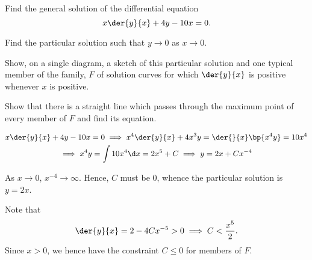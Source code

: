 \begin{problem}
    Find the general solution of the differential equation \[x\der{y}{x} + 4y - 10x = 0.\]

    Find the particular solution such that $y \to 0$ as $x \to 0$.

    Show, on a single diagram, a sketch of this particular solution and one typical member of the family, $F$ of solution curves for which $\der{y}{x}$ is positive whenever $x$ is positive.

    Show that there is a straight line which passes through the maximum point of every member of $F$ and find its equation.
\end{problem}
\begin{solution}
    \begin{gather*}
        x\der{y}{x} + 4y - 10x = 0 \implies x^4\der{y}{x} + 4x^3y = \der{}{x} \bp{x^4 y} = 10x^4\\
        \implies x^4 y = \int 10 x^4 \d x = 2x^5 + C \implies y = 2x + Cx^{-4}
    \end{gather*}

    As $x \to 0$, $x^{-4} \to \infty$. Hence, $C$ must be 0, whence the particular solution is $y = 2x$.

    Note that \[\der{y}{x} = 2 - 4Cx^{-5} > 0 \implies C < \frac{x^5}2.\] Since $x > 0$, we hence have the constraint $C \leq 0$ for members of $F$.

    \begin{center}
    \end{center}


\end{solution}
